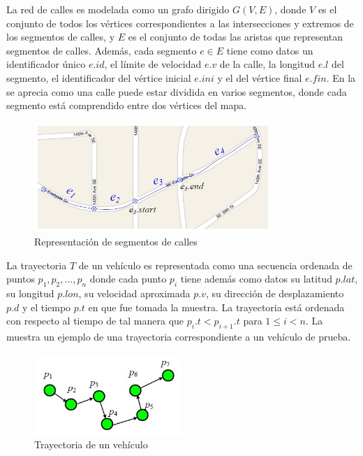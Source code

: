 La red de calles es modelada como un grafo dirigido $G(V,E)$, donde $V$ es el conjunto de todos los vértices correspondientes a las intersecciones y extremos de los segmentos de calles, y $E$ es el conjunto de todas las aristas que representan segmentos de calles. Además, cada segmento $e \in E$ tiene como datos un identificador único $e.id$, el límite de velocidad $e.v$ de la calle, la longitud $e.l$ del segmento, el identificador del vértice inicial $e.ini$ y el del vértice final $e.fin$. En la  se aprecia como una calle puede estar dividida en varios segmentos, donde cada segmento está comprendido entre dos vértices del mapa.

\begin{figure}[h*]
	\centering
	\includegraphics[width=0.8\textwidth]{capitulos/6/figuras/figura4.jpg}
	\caption{\label{fig:segmentos_de_calle} Representación de segmentos de calles}	
\end{figure}

La trayectoria $T$ de un vehículo es representada como una secuencia ordenada de puntos $p_1, p_2, \dots, p_n$ donde cada punto $p_i$ tiene además como datos su latitud $p.lat$, su longitud $p.lon$, su velocidad aproximada $p.v$, su dirección de desplazamiento $p.d$ y el tiempo $p.t$ en que fue tomada la muestra. La trayectoria está ordenada con respecto al tiempo de tal manera que $p_i.t < p_{i + 1}.t$ para $1 \le i < n$. La  muestra un ejemplo de una trayectoria correspondiente a un vehículo de prueba.

\begin{figure}[h*]
	\centering
	\includegraphics[width=0.5\textwidth]{capitulos/6/figuras/figura5.jpg}
	\caption{\label{fig:trayectoria} Trayectoria de un vehículo}	
\end{figure}

